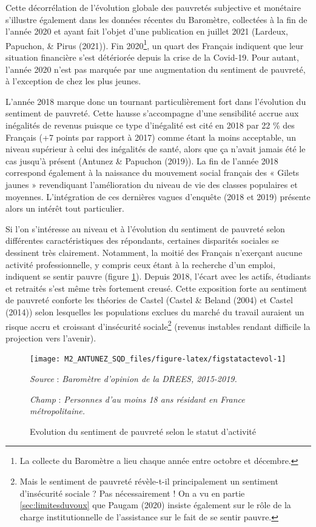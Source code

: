\documentclass[12pt,a4paper]{reedthesis}
\begin{document}
Cette décorrélation de l'évolution globale des pauvretés subjective et monétaire s'illustre également dans les données récentes du Baromètre, collectées à la fin de l'année 2020 et ayant fait l'objet d'une publication en juillet 2021 (Lardeux, Papuchon, \& Pirus (2021)). Fin 2020\footnote{La collecte du Baromètre a lieu chaque année entre octobre et décembre.}, un quart des Français indiquent que leur situation financière s'est détériorée depuis la crise de la Covid-19. Pour autant, l'année 2020 n'est pas marquée par une augmentation du sentiment de pauvreté, à l'exception de chez les plus jeunes.

L'année 2018 marque donc un tournant particulièrement fort dans l'évolution du sentiment de pauvreté. Cette hausse s'accompagne d'une sensibilité accrue aux inégalités de revenus puisque ce type d'inégalité est cité en 2018 par 22 \% des Français (+7 points par rapport à 2017) comme étant la moins acceptable, un niveau supérieur à celui des inégalités de santé, alors que ça n'avait jamais été le cas jusqu'à présent (Antunez \& Papuchon (2019)). La fin de l'année 2018 correspond également à la naissance du mouvement social français des « Gilets jaunes » revendiquant l'amélioration du niveau de vie des classes populaires et moyennes. L'intégration de ces dernières vagues d'enquête (2018 et 2019) présente alors un intérêt tout particulier.

Si l'on s'intéresse au niveau et à l'évolution du sentiment de pauvreté selon différentes caractéristiques des répondants, certaines disparités sociales se dessinent très clairement. Notamment, la moitié des Français n'exerçant aucune activité professionnelle, y compris ceux étant à la recherche d'un emploi, indiquent se sentir pauvre (figure \ref{fig:figstatactevol}). Depuis 2018, l'écart avec les actifs, étudiants et retraités s'est même très fortement creusé. Cette exposition forte au sentiment de pauvreté conforte les théories de Castel (Castel \& Beland (2004) et Castel (2014)) selon lesquelles les populations exclues du marché du travail auraient un risque accru et croissant d'insécurité sociale\footnote{Mais le sentiment de pauvreté révèle-t-il principalement un sentiment d'insécurité sociale ? Pas nécessairement ! On a vu en partie \ref{sec:limitesduvoux} que Paugam (2020) insiste également sur le rôle de la charge institutionnelle de l'assistance sur le fait de se sentir pauvre.} (revenus instables rendant difficile la projection vers l'avenir).
\begin{figure}[!ht]

{\centering \texttt{[image: M2\_ANTUNEZ\_SQD\_files/figure-latex/figstatactevol-1]} 

}

\caption[Evolution du sentiment de pauvreté selon le statut d'activité]{Evolution du sentiment de pauvreté selon le statut d'activité}\label{fig:figstatactevol}

\footnotesize


\emph{Source} : \emph{Baromètre d’opinion de la DREES, 2015-2019.}


\emph{Champ} : \emph{Personnes d’au moins 18 ans résidant en France métropolitaine.}
\normalsize\end{figure}
\end{document}
